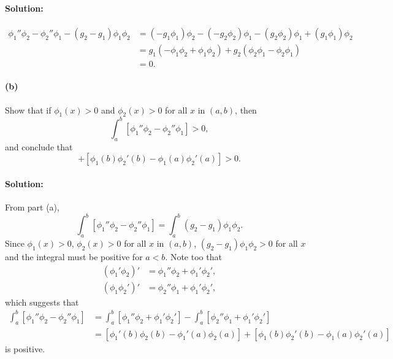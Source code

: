 \documentclass{article}
\begin{document}
\paragraph{Solution:} \begin{align*}
  \phi_1''\phi_2 - \phi_2''\phi_1 - (g_2 - g_1)\phi_1\phi_2
  &= (-g_1\phi_1)\phi_2 - (-g_2\phi_2)\phi_1
    - (g_2\phi_2)\phi_1 + (g_1\phi_1)\phi_2 \\
  &= g_1(-\phi_1\phi_2 + \phi_1\phi_2) + g_2(\phi_2\phi_1 - \phi_2\phi_1) \\
  &= 0.
\end{align*}

\paragraph{(b)} Show that if $\phi_1(x) > 0$ and $\phi_2(x) > 0$ for all $x$ in
$(a, b)$, then \begin{equation*}
  \int_a^b [\phi_1''\phi_2 - \phi_2''\phi_1] > 0,
\end{equation*} and conclude that \begin{equation*}
  [\phi_1'(b)\phi_2(b) - \phi_1'(a)\phi_2(a)]
  + [\phi_1(b)\phi_2'(b) - \phi_1(a)\phi_2'(a)] > 0.
\end{equation*}

\paragraph{Solution:} From part (a), \begin{equation*}
  \int_a^b [\phi_1''\phi_2 - \phi_2''\phi_1]
  = \int_a^b (g_2 - g_1)\phi_1\phi_2.
\end{equation*} Since $\phi_1(x) > 0$, $\phi_2(x) > 0$ for all $x$ in $(a, b)$,
$(g_2 - g_1)\phi_1\phi_2 > 0$ for all $x$ and the integral must be positive for
$a < b$. Note too that \begin{align*}
  (\phi_1'\phi_2)' &= \phi_1''\phi_2 + \phi_1'\phi_2', \\
  (\phi_1\phi_2')' &= \phi_2''\phi_1 + \phi_1'\phi_2',
\end{align*} which suggests that \begin{align*}
  \int_a^b [\phi_1''\phi_2 - \phi_2''\phi_1]
  &= \int_a^b [\phi_1''\phi_2 + \phi_1'\phi_2']
    - \int_a^b [\phi_2''\phi_1 + \phi_1'\phi_2'] \\
  &= [\phi_1'(b)\phi_2(b) - \phi_1'(a)\phi_2(a)]
    + [\phi_1(b)\phi_2'(b) - \phi_1(a)\phi_2'(a)]
\end{align*} is positive.
\end{document}
